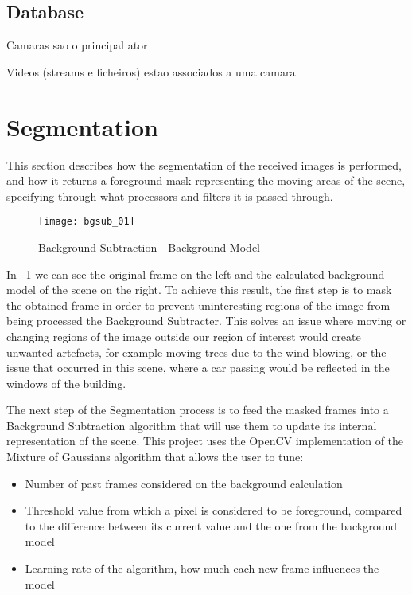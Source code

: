 \subsection{Database}

Camaras sao o principal ator

Videos (streams e ficheiros) estao associados a uma camara


\section{Segmentation}

This section describes how the segmentation of the received images is performed, and how it returns a foreground mask representing the moving areas of the scene, specifying through what processors and filters it is passed through. 

\begin{figure}[t]
  \begin{center}
    \leavevmode
    \texttt{[image: bgsub\_01]}
    \caption{Background Subtraction - Background Model}
    \label{fig:bgsub_01}
  \end{center}
\end{figure}

In ~\ref{fig:bgsub_01} we can see the original frame on the left and the calculated background model of the scene on the right. To achieve this result, the first step is to mask the obtained frame  in order to prevent uninteresting regions of the image from being processed the Background Subtracter. This solves an issue where moving or changing regions of the image outside our region of interest would create unwanted artefacts, for example moving trees due to the wind blowing, or the issue that occurred in this scene, where a car passing would be reflected in the windows of the building.

The next step of the Segmentation process is to feed the masked frames into a Background Subtraction algorithm that will use them to update its internal representation of the scene. This project uses the OpenCV implementation of the Mixture of Gaussians algorithm that allows the user to tune:

\begin{itemize}
	\item Number of past frames considered on the background calculation
	\item Threshold value from which a pixel is considered to be foreground, compared to the difference between its current value and the one from the background model
	\item Learning rate of the algorithm, how much each new frame influences the model
\end{itemize}


